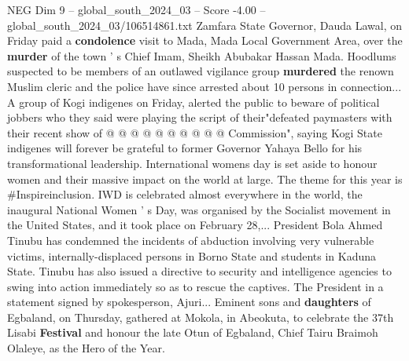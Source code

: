 \begin{textsample}{NEG Dim 9 – global\_south\_2024\_03 – Score -4.00 – global\_south\_2024\_03/106514861.txt}
Zamfara State Governor, Dauda Lawal, on Friday paid a \textbf{condolence} visit to Mada, Mada Local Government Area, over the \textbf{murder} of the town ' s Chief Imam, Sheikh Abubakar Hassan Mada.
Hoodlums suspected to be members of an outlawed vigilance group \textbf{murdered} the renown Muslim cleric and the police have since arrested about 10 persons in connection...
A group of Kogi indigenes on Friday, alerted the public to beware of political jobbers who they said were playing the script of their"defeated paymasters with their recent show of @ @ @ @ @ @ @ @ @ @ Commission", saying Kogi State indigenes will forever be grateful to former Governor Yahaya Bello for his transformational leadership.
International womens day is set aside to honour women and their massive impact on the world at large.
The theme for this year is \#Inspireinclusion.
IWD is celebrated almost everywhere in the world, the inaugural National Women ' s Day, was organised by the Socialist movement in the United States, and it took place on February 28,...
President Bola Ahmed Tinubu has condemned the incidents of abduction involving very vulnerable victims, internally-displaced persons in Borno State and students in Kaduna State.
Tinubu has also issued a directive to security and intelligence agencies to swing into action immediately so as to rescue the captives.
The President in a statement signed by spokesperson, Ajuri...
Eminent sons and \textbf{daughters} of Egbaland, on Thursday, gathered at Mokola, in Abeokuta, to celebrate the 37th Lisabi \textbf{Festival} and honour the late Otun of Egbaland, Chief Tairu Braimoh Olaleye, as the Hero of the Year.

\end{textsample}
